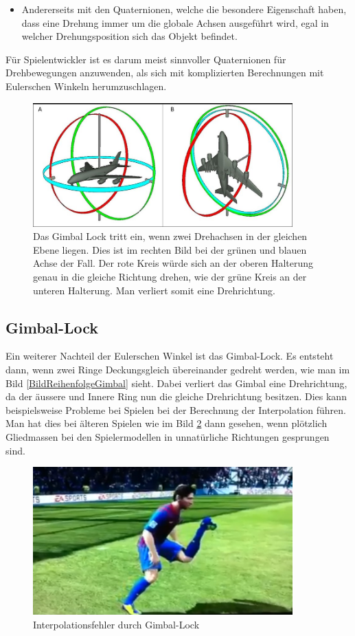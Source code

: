 \begin{itemize}
	\item Andererseits mit den Quaternionen, welche die besondere Eigenschaft haben, dass eine Drehung immer um die globale Achsen ausgeführt wird, egal in welcher Drehungsposition sich das Objekt befindet.
\end{itemize}
Für Spielentwickler ist es darum meist sinnvoller Quaternionen für Drehbewegungen anzuwenden, als sich mit komplizierten Berechnungen mit Eulerschen Winkeln herumzuschlagen.

\begin{figure}
	\centering
	\includegraphics[width=10cm]{papers/clifford/Bilder/ReihenfolgeGimbal.png}
	\caption{Das Gimbal Lock tritt ein, wenn zwei Drehachsen in der gleichen Ebene liegen. Dies ist im rechten Bild bei der grünen und blauen Achse der Fall. Der rote Kreis würde sich an der oberen Halterung genau in die gleiche Richtung drehen, wie der grüne Kreis an der unteren Halterung. Man verliert somit eine Drehrichtung.}
	\label{BildReihenfolgeGimbal}
\end{figure}

\subsection{Gimbal-Lock}
Ein weiterer Nachteil der Eulerschen Winkel ist das Gimbal-Lock. Es entsteht dann, wenn zwei Ringe Deckungsgleich übereinander gedreht werden, wie man im Bild \eqref{BildReihenfolgeGimbal} sieht. Dabei verliert das Gimbal eine Drehrichtung, da der äussere und Innere Ring nun die gleiche Drehrichtung besitzen. Dies kann beispielsweise Probleme bei Spielen bei der Berechnung der Interpolation führen. Man hat dies bei älteren Spielen wie im Bild \ref{BildGimbalLock} dann gesehen, wenn plötzlich Gliedmassen bei den Spielermodellen in unnatürliche Richtungen gesprungen sind.

\begin{figure}
	\centering
	\includegraphics[width=10cm]{papers/clifford/Bilder/GimbalLock.png}
	\caption{Interpolationsfehler durch Gimbal-Lock}
	\label{BildGimbalLock}
\end{figure}